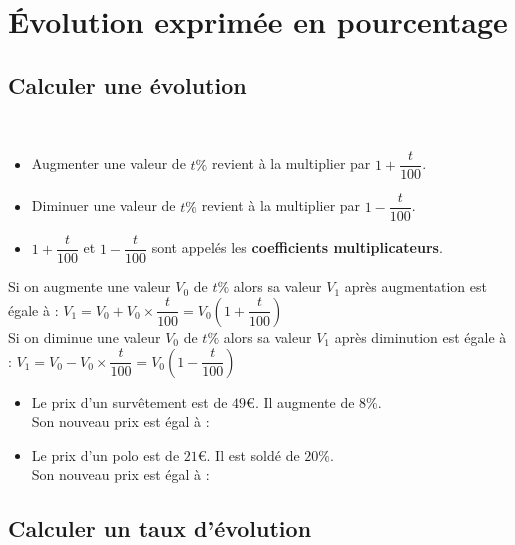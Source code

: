 \newpage

\section{Évolution exprimée en pourcentage}

\subsection{Calculer une évolution}

\begin{Propriétés} $ $\\
\begin{itemize}[label=\textcolor{Couleur2}{$\bullet$}]
\item Augmenter une valeur de $t\%$ revient à la multiplier par $1+\dfrac{t}{100}$.
\item Diminuer une valeur de $t\%$ revient à la multiplier par $1-\dfrac{t}{100}$.
\item $1+\dfrac{t}{100}$ et $1-\dfrac{t}{100}$ sont appelés les {\bf{coefficients multiplicateurs}}. 
\end{itemize}
\end{Propriétés}

\begin{Remarque}
Si on augmente une valeur $V_0$ de $t\%$ alors sa valeur $V_1$ après augmentation est égale à : $V_1=V_0+V_0\times \dfrac{t}{100}=V_0\left(1+\dfrac{t}{100}\right)$\\
Si on diminue une valeur $V_0$ de $t\%$ alors sa valeur $V_1$ après diminution est égale à : $V_1=V_0-V_0\times \dfrac{t}{100}=V_0\left(1-\dfrac{t}{100}\right)$
\end{Remarque}

\begin{Exemples}
\leavevmode\vspace{-\baselineskip}
\begin{itemize}
\item Le prix d'un survêtement est de $49$€. Il augmente de $8\%$. \\
Son nouveau prix est égal à : \ligne

\item Le prix d'un polo est de $21$€. Il est soldé de $20\%$. \\
Son nouveau prix est égal à : \ligne
\end{itemize}
\end{Exemples}

\subsection{Calculer un taux d'évolution}


